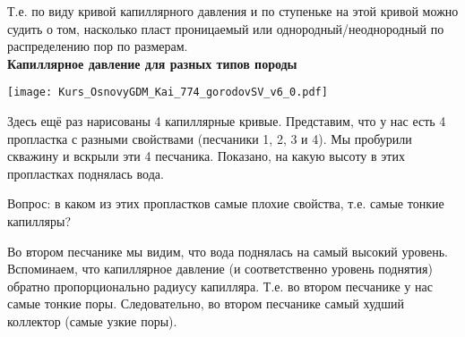 Т.е. по виду кривой капиллярного давления и по ступеньке на этой кривой можно судить о том, насколько пласт проницаемый или однородный/неоднородный по распределению пор по размерам.
\\

\textbf{Капиллярное давление для разных типов породы}

\texttt{[image: Kurs\_OsnovyGDM\_Kai\_774\_gorodovSV\_v6\_0.pdf]}

Здесь ещё раз нарисованы 4 капиллярные кривые.
Представим, что у нас есть 4 пропластка с разными свойствами (песчаники 1, 2, 3 и 4).
Мы пробурили скважину и вскрыли эти 4 песчаника.
Показано, на какую высоту в этих пропластках поднялась вода. 

Вопрос: в каком из этих пропластков самые плохие свойства, т.е. самые тонкие капилляры?

Во втором песчанике мы видим, что вода поднялась на самый высокий уровень. Вспоминаем, что капиллярное давление (и соответственно уровень поднятия) обратно пропорционально радиусу капилляра. Т.е. во втором песчанике у нас самые тонкие поры.
Следовательно, во втором песчанике самый худший коллектор (самые узкие поры).


